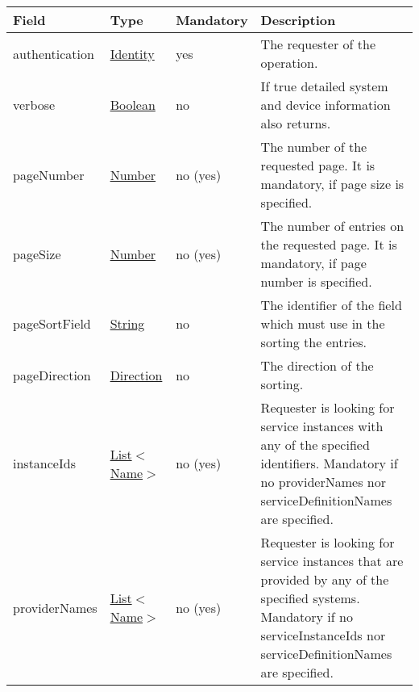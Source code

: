 \documentclass[a4paper]{arrowhead}
\newcommand{\pref}[1]{{\textcolor{ArrowheadGrey}{\hyperref[sec:model:primitives:#1]{#1}}}}
\begin{document}
\begin{table}[ht!]
\begin{tabularx}{\textwidth}{| p{5.3cm} | p{4.8cm} | p{2cm} | X |} \hline
\rowcolor{gray!33} Field & Type & Mandatory & Description \\ \hline
authentication & \hyperref[sec:model:Identity]{Identity} & yes & The requester of the ope\-ration. \\ \hline
verbose & \pref{Boolean} & no & If true detailed system and device information also returns. \\ \hline
pageNumber & \pref{Number} & no (yes) & The number of the requested page. It is mandatory, if page size is specified. \\ \hline
pageSize & \pref{Number} & no (yes) & The number of entries on the requested page. It is mandatory, if page number is specified. \\ \hline
pageSortField & \pref{String} & no & The identifier of the field which must use in the sorting the entries. \\ \hline
pageDirection & \pref{Direction} & no & The direction of the sorting. \\ \hline
instanceIds &  \pref{List}$<$\pref{Name}$>$ & no (yes) & Requester is looking for service instances with any of the spe\-cified identifiers. Mandatory if no providerNames nor serviceDefinitionNames are spe\-cified. \\ \hline
providerNames &  \pref{List}$<$\pref{Name}$>$ & no (yes) & Requester is looking for service ins\-tances that are provided by any of the specified systems. Mandatory if no serviceInstanceIds nor serviceDefinitionNames are spe\-cified. \\ \hline
\end{tabularx}
\end{table}

\clearpage
\end{document}
